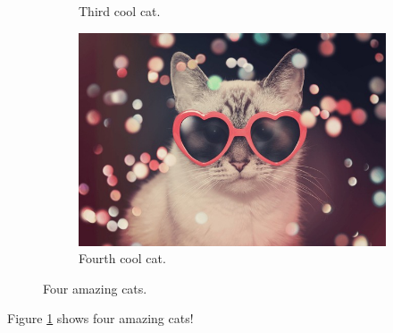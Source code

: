 \documentclass{article}
\begin{document}
\begin{figure}[h!]
\begin{subfigure}[b]{0.3\linewidth}
	\caption{Third cool cat.}
\end{subfigure}
\begin{subfigure}[b]{0.5\linewidth}
	\includegraphics[width=\linewidth]{last_cool_cat.jpg}
	\caption{Fourth cool cat.}
\end{subfigure}
\caption{Four amazing cats.}
\label{fig:four_cats}
\end{figure}

Figure \ref{fig:four_cats} shows four amazing cats!
\end{document}
